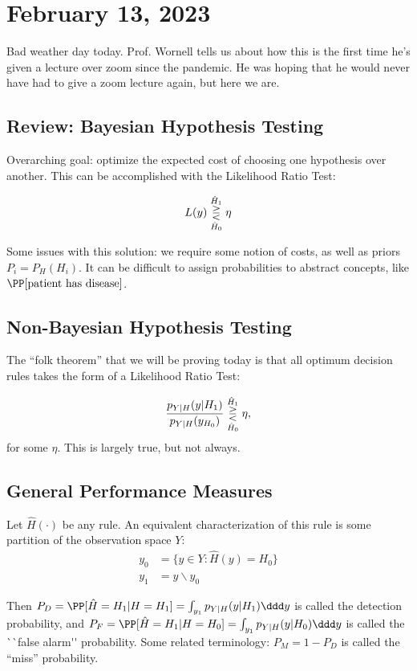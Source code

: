 \section{February 13, 2023}

Bad weather day today. Prof. Wornell tells us about how this is the first time he's given a lecture over zoom since the pandemic. He was hoping that he would never have had to give a zoom lecture again, but here we are. 

\subsection{Review: Bayesian Hypothesis Testing}

Overarching goal: optimize the expected cost of choosing one hypothesis over another. This can be accomplished with the Likelihood Ratio Test: 

\[L(y) \overunderset{\hat{H}_1}{\hat{H}_0}{\gtreqless} \eta \] 

Some issues with this solution: we require some notion of costs, as well as priors $P_i = P_{H}(H_i)$. It can be difficult to assign probabilities to abstract concepts, like $\PP[\text{patient has disease}]$.

\subsection{Non-Bayesian Hypothesis Testing}

The ``folk theorem'' that we will be proving today is that all optimum decision rules takes the form of a Likelihood Ratio Test:

\[\frac{p_{Y|H}(y|H_1)}{p_{Y|H}(y_{H_0})}\overunderset{\hat{H}_1}{\hat{H}_0}{\gtreqless} \eta,\]
for some $\eta$. This is largely true, but not always.

\subsection{General Performance Measures}
Let $\hat{H}(\cdot)$ be any rule. An equivalent characterization of this rule is some partition of the observation space $Y$: 
\begin{align*}
	y_0 &= \{y\in Y : \hat{H}(y) = H_0\} \\
	y_1 &= y\backslash y_0
\end{align*}

Then $P_D = \PP[\hat{H}=H_1|H=H_1] = \int_{y_1}p_{Y|H}(y|H_1)\ddd y$ is called the \ac{detection probability}, and $P_F = \PP[\hat{H}=H_1|H=H_0] = \int_{y_1}p_{Y|H}(y|H_0)\ddd y$ is called the \ac{``false alarm'' probability}. Some related terminology: $P_M = 1-P_D$ is called the ``miss'' probability. 

